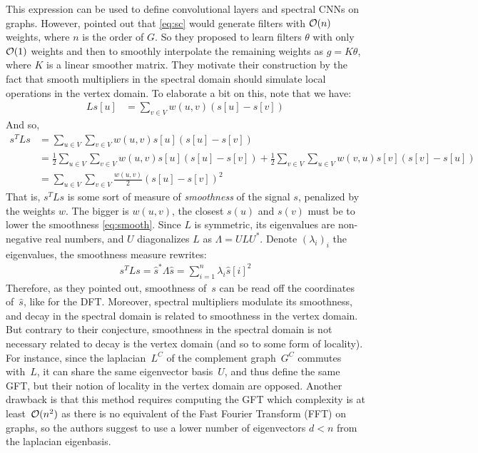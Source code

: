 This expression can be used to define convolutional layers and spectral CNNs on graphs. However, \cite{bruna2013spectral} pointed out that \eqref{eq:sc} would generate filters with $\mathcal{O}(n)$ weights, where $n$ is the order of $G$. So they proposed to learn filters $\theta$ with only $\mathcal{O}(1)$ weights and then to smoothly interpolate the remaining weights as $g = K \theta$, where $K$ is a linear smoother matrix. They motivate their construction by the fact that smooth multipliers in the spectral domain should simulate local operations in the vertex domain. To elaborate a bit on this, note that we have:
\begin{align}
Ls[u] &= \displaystyle\sum_{v \in V} w(u,v)(s[u] - s[v])
\end{align}
And so,
\begin{align}
s^TLs &= \displaystyle\sum_{u \in V}\sum_{v \in V} w(u,v)s[u](s[u] - s[v])\nonumber\\
&= \displaystyle \frac{1}2\sum_{u \in V}\sum_{v \in V} w(u,v)s[u](s[u] - s[v]) + \frac{1}2\sum_{v \in V}\sum_{u \in V} w(v,u)s[v](s[v] - s[u])\nonumber\\
&=  \displaystyle\sum_{u \in V}\sum_{v \in V} \frac{w(u,v)}2(s[u] - s[v])^2 \label{eq:smooth}
\end{align}
That is, $s^TLs$ is some sort of measure of \emph{smoothness} of the signal $s$, penalized by the weights $w$. The bigger is $w(u,v)$, the closest $s(u)$ and $s(v)$ must be to lower the smoothness \eqref{eq:smooth}. Since $L$ is symmetric, its eigenvalues are non-negative real numbers, and $U$ diagonalizes $L$ as $\Lambda = ULU^*$. Denote $(\lambda_i)_i$ the eigenvalues, the smoothness measure rewrites:
\begin{align}
s^TLs = \widehat{s}^*\Lambda\widehat{s} = \displaystyle\sum_{i=1}^n \lambda_i \widehat{s}[i]^2
\end{align}
Therefore, as they pointed out, smoothness of~$s$ can be read off the coordinates of~$\hat{s}$, like for the DFT. Moreover, spectral multipliers modulate its smoothness, and decay in the spectral domain is related to smoothness in the vertex domain. But contrary to their conjecture, smoothness in the spectral domain is not necessary related to decay is the vertex domain (and so to some form of locality). For instance, since the laplacian~$L^C$ of the complement graph~$G^C$ commutes with~$L$, it can share the same eigenvector basis~$U$, and thus define the same GFT, but their notion of locality in the vertex domain are opposed. Another drawback is that this method requires computing the GFT which complexity is at least~$\mathcal{O}(n^2)$ as there is no equivalent of the Fast Fourier Transform (FFT) on graphs, so the authors suggest to use a lower number of eigenvectors $d < n$ from the laplacian eigenbasis.

